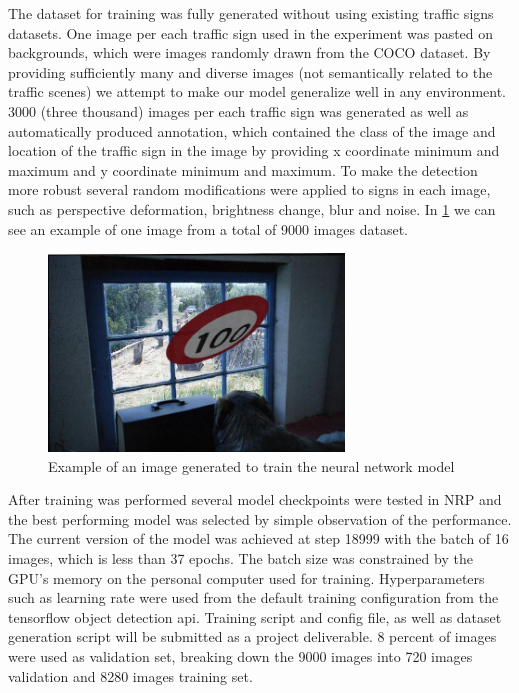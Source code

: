 The dataset for training was fully generated without using existing traffic signs datasets. One image per each traffic sign used in the experiment was pasted on backgrounds, which were images randomly drawn from the COCO dataset. By providing sufficiently many and diverse images (not semantically related to the traffic scenes) we attempt to make our model generalize well in any environment. 3000 (three thousand) images per each traffic sign was generated as well as automatically produced annotation, which contained the class of the image and location of the traffic sign in the image by providing x coordinate minimum and maximum and y coordinate minimum and maximum. To make the detection more robust several random modifications were applied to signs in each image, such as perspective deformation, brightness change, blur and noise. In \ref{fig:img} we can see an example of one image from a total of 9000 images dataset.

\begin{figure}
  \centering
  \includegraphics[width=0.7\textwidth]{chapter/images/img-1.jpg}
  \caption{Example of an image generated to train the neural network model}
  \label{fig:img}
\end{figure}


After training was performed several model checkpoints were tested in NRP and the best performing model was selected by simple observation of the performance. The current version of the model was achieved at step 18999 with the batch of 16 images, which is less than 37 epochs. The batch size was constrained by the GPU's memory on the personal computer used for training. Hyperparameters such as learning rate were used from the default training configuration from the tensorflow object detection api. Training script and config file, as well as dataset generation script will be submitted as a project deliverable. 8 percent of images were used as validation set, breaking down the 9000 images into 720 images validation and 8280 images training set.



